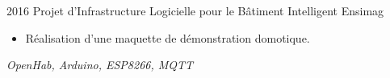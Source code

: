 \cventry
  {2016}
  {Projet d'Infrastructure Logicielle pour le Bâtiment Intelligent}
  {}
  {Ensimag}
  {}
  {
      \begin{itemize}
          \item Réalisation d'une maquette de démonstration domotique.
      \end{itemize}
      \vspace*{1mm}
      \textit{OpenHab, Arduino, ESP8266, MQTT}
  }